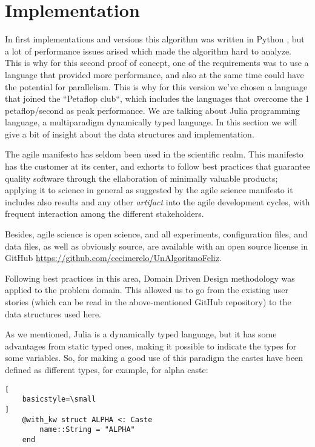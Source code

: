 \section{Implementation}
\label{sec:implementation}

In first implementations and versions this algorithm was written in Python
\cite{merelo_molina_2021}, but a lot of performance issues arised which made the
algorithm hard to analyze. This is why for this second proof of concept, one of
the requirements was to use a language that provided more performance, and also
at the same time could have the potential for parallelism. This is why for this
version we've chosen a language that joined the ``Petaflop club``, which
includes the languages that overcome the 1 petaflop/second as peak
performance. We are talking about Julia \cite{julia} programming language, a
multiparadigm dynamically typed language. In this section we will give a bit of
insight about the data structures and implementation.

The agile manifesto has seldom been used in the scientific realm. This manifesto
has the customer at its center, and exhorts to follow best practices that
guarantee quality software through the ellaboration of minimally valuable
products; applying it to science in general as suggested by the agile science
manifesto \cite{agile_manifesto} it includes also results and any other {\em
  artifact} into the agile development cycles, with frequent interaction among
the different stakeholders.

Besides, agile science is open science, and all experiments, configuration
files, and data files, as well as obviously source, are available with an open
source license in GitHub \url{https://github.com/cecimerelo/UnAlgoritmoFeliz}.

Following best practices in this area, Domain Driven Design
\cite{evans2004domain} methodology was
applied to the problem domain. This allowed us to go from the existing user
stories (which can be read in the above-mentioned GitHub repository) to the data
structures used here.

As we mentioned, Julia is a dynamically typed language, but it has some
advantages from static typed ones, making it possible to indicate the types for
some variables. So, for making a good use of this paradigm the castes have been
defined as different types, for example, for alpha caste:

\begin{lstlisting}[
    basicstyle=\small
]
    @with_kw struct ALPHA <: Caste
        name::String = "ALPHA"
    end
\end{lstlisting}


